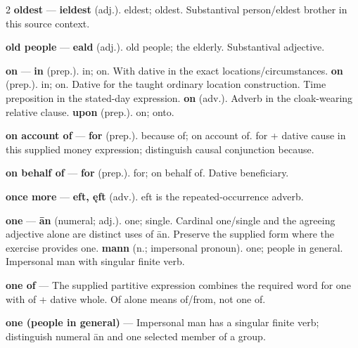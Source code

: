 \begin{multicols}{2}
\textbf{oldest} — \textbf{ieldest} (adj.). eldest; oldest. Substantival person/eldest brother in this source context.\par
\textbf{old people} — \textbf{eald} (adj.). old people; the elderly. Substantival adjective.\par
\textbf{on} — \textbf{in} (prep.). in; on. With dative in the exact locations/circumstances. \textbf{on} (prep.). in; on. Dative for the taught ordinary location construction. Time preposition in the stated-day expression. \textbf{on} (adv.). Adverb in the cloak-wearing relative clause. \textbf{upon} (prep.). on; onto.\par
\textbf{on account of} — \textbf{for} (prep.). because of; on account of. for + dative cause in this supplied money expression; distinguish causal conjunction because.\par
\textbf{on behalf of} — \textbf{for} (prep.). for; on behalf of. Dative beneficiary.\par
\textbf{once more} — \textbf{eft, ęft} (adv.). eft is the repeated-occurrence adverb.\par
\textbf{one} — \textbf{ān} (numeral; adj.). one; single. Cardinal one/single and the agreeing adjective alone are distinct uses of ān. Preserve the supplied form where the exercise provides one. \textbf{mann} (n.; impersonal pronoun). one; people in general. Impersonal man with singular finite verb.\par
\textbf{one of} — The supplied partitive expression combines the required word for one with of + dative whole. Of alone means of/from, not one of.\par
\textbf{one (people in general)} — Impersonal man has a singular finite verb; distinguish numeral ān and one selected member of a group.\par

\end{multicols}

